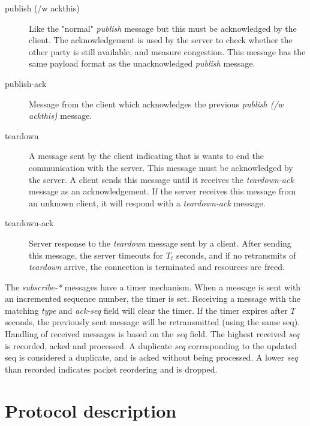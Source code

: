 \documentclass[a4paper]{article}
\begin{document}
\begin{description}
	\item[publish (/w ackthis)] Like the "normal" \emph{publish} message
	but this must be acknowledged by the client. The acknowledgement is used
	by the server to check whether the other party is still	available, and measure
    congestion. This message has the same payload format as the unacknowledged
    \emph{publish} message.
    
	\item[publish-ack] Message from the client which acknowledges the previous
	\emph{publish (/w ackthis)} message.
    
	\item[teardown] A message sent by the client indicating that is 
	wants to end the communication with the server. This message must be 
	acknowledged by the server. A client sends this message until it receives 
	the \emph{teardown-ack} message as an acknowledgement. If the server 
	receives this message from an unknown client, it will respond with a
	\emph{teardown-ack} message.
    
	\item[teardown-ack] Server response to the \emph{teardown} message
	sent by a client. After sending this message, the server timeouts for $T_t$
    seconds, and if no retransmits of \emph{teardown} arrive, the connection is
    terminated and resources are freed.
\end{description}

The \emph{subscribe-*} messages have a timer mechanism.
When a message is sent with an incremented sequence number, the timer is set.
Receiving a message with the matching \emph{type} and \emph{ack-seq} field will clear the timer.
If the timer expires after $T$ seconds, the previously sent message will be retransmitted (using the same seq).
Handling of received messages is based on the \emph{seq} field.
The highest received \emph{seq} is recorded, acked and processed.
A duplicate \emph{seq} corresponding to the updated seq is considered a duplicate, and is acked without being processed.
A lower \emph{seq} than recorded indicates packet reordering and is dropped.

\section{Protocol description}
\end{document}
